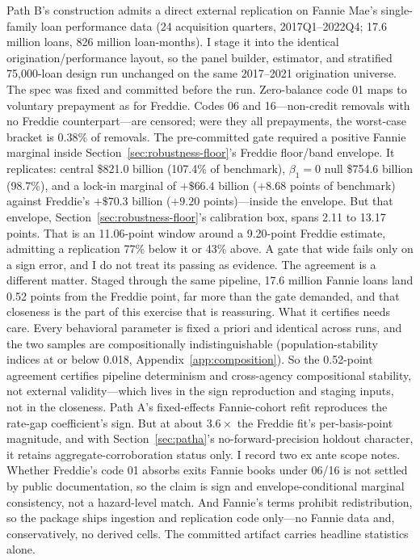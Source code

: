 \documentclass[12pt]{article}
\begin{document}
Path B's construction admits a direct external replication on Fannie Mae's single-family loan performance data (24 acquisition quarters, 2017Q1--2022Q4; 17.6 million loans, 826 million loan-months). I stage it into the identical origination/performance layout, so the panel builder, estimator, and stratified 75{,}000-loan design run unchanged on the same 2017--2021 origination universe. The spec was fixed and committed before the run. Zero-balance code 01 maps to voluntary prepayment as for Freddie. Codes 06 and 16---non-credit removals with no Freddie counterpart---are censored; were they all prepayments, the worst-case bracket is 0.38\% of removals. The pre-committed gate required a positive Fannie marginal inside Section~\ref{sec:robustness-floor}'s Freddie floor/band envelope. It replicates: central \$821.0 billion (107.4\% of benchmark), $\beta_1 = 0$ null \$754.6 billion (98.7\%), and a lock-in marginal of $+\$66.4$ billion ($+8.68$ points of benchmark) against Freddie's $+\$70.3$ billion ($+9.20$ points)---inside the envelope. But that envelope, Section~\ref{sec:robustness-floor}'s calibration box, spans 2.11 to 13.17 points. That is an 11.06-point window around a 9.20-point Freddie estimate, admitting a replication 77\% below it or 43\% above. A gate that wide fails only on a sign error, and I do not treat its passing as evidence. The agreement is a different matter. Staged through the same pipeline, 17.6 million Fannie loans land 0.52 points from the Freddie point, far more than the gate demanded, and that closeness is the part of this exercise that is reassuring. What it certifies needs care. Every behavioral parameter is fixed a priori and identical across runs, and the two samples are compositionally indistinguishable (population-stability indices at or below 0.018, Appendix~\ref{app:composition}). So the 0.52-point agreement certifies pipeline determinism and cross-agency compositional stability, not external validity---which lives in the sign reproduction and staging inputs, not in the closeness. Path A's fixed-effects Fannie-cohort refit reproduces the rate-gap coefficient's sign. But at about $3.6\times$ the Freddie fit's per-basis-point magnitude, and with Section~\ref{sec:patha}'s no-forward-precision holdout character, it retains aggregate-corroboration status only. I record two ex ante scope notes. Whether Freddie's code 01 absorbs exits Fannie books under 06/16 is not settled by public documentation, so the claim is sign and envelope-conditional marginal consistency, not a hazard-level match. And Fannie's terms prohibit redistribution, so the package ships ingestion and replication code only---no Fannie data and, conservatively, no derived cells. The committed artifact carries headline statistics alone.
\end{document}

